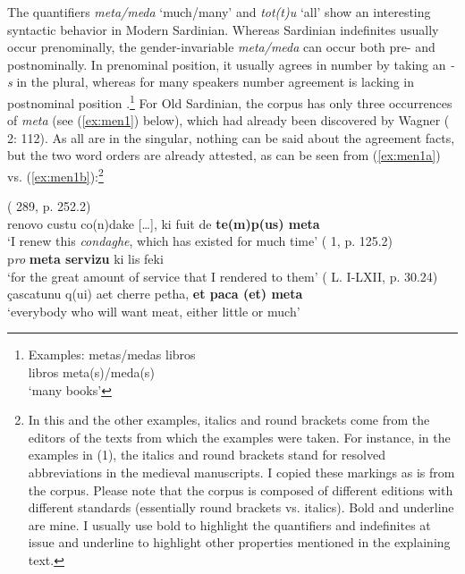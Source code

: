 \documentclass[output=paper,colorlinks,citecolor=brown]{langscibook}
\begin{document}
The quantifiers \textit{meta/meda} ‘much/many’ and \textit{tot(t)u} ‘all’ show an interesting syntactic behavior in Modern Sardinian. Whereas Sardinian indefinites usually occur prenominally, the gender-invariable \textit{meta/meda} can occur both pre- and postnominally. In prenominal position, it usually agrees in number by taking an \textit{-s} in the plural, whereas for many speakers number agreement is lacking in postnominal position \citep[][36]{Jones1993}.\footnote{Examples:
 \ea metas/medas libros \\
    \ex libros meta(s)/meda(s)\\
        ‘many books’
    \z}
    For Old Sardinian, the corpus  has only three occurrences of \textit{meta} (see (\ref{ex:men1}) below), which had already been discovered by Wagner ( 2: 112). As all are in the singular, nothing can be said about the agreement facts, but the two word orders are already attested, as can be seen from (\ref{ex:men1a}) vs. (\ref{ex:men1b}):\footnote{In this and the other examples, italics and round brackets come from the editors of the texts from which the examples were taken. For instance, in the examples in (1), the italics and round brackets stand for resolved abbreviations in the medieval manuscripts. I copied these markings as is from the  corpus. Please note that the corpus is composed of different editions with different standards (essentially round brackets vs. italics). Bold and underline are mine. I usually use bold to highlight the quantifiers and indefinites at issue and underline to highlight other properties mentioned in the explaining text.}

\ea \label{ex:men1}
    \ea\label{ex:men1a}( 289, p. 252.2)\\
         renovo custu co(n)dake […], ki fuit de \textbf{te(m)p(us) meta}\\
        ‘I renew this \textit{condaghe}, which has existed for much time’
    \ex\label{ex:men1b}( 1, p. 125.2) \\
         p\textit{ro} \textbf{meta servizu} ki lis feki\\
        ‘for the great amount of service that I rendered to them’
    \ex\label{ex:men1c}( L. I-LXII, p. 30.24)\\
         çascatunu q(ui) aet cherre petha, \textbf{et paca (et) meta}\\
        ‘everybody who will want meat, either little or much’
    \z
\z
\end{document}
